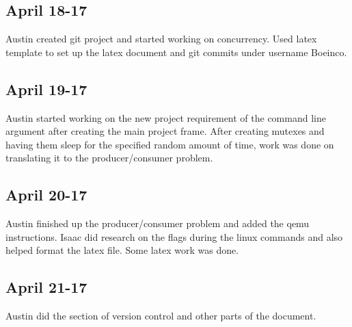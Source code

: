 \documentclass[letterpaper,10pt,titlepage]{article}
\begin{document}
\subsection{April 18-17}
Austin created git project and started working on concurrency.  Used latex template to set up the latex document and git commits under username Boeinco.
\subsection{April 19-17}
Austin started working on the new project requirement of the command line argument after creating the main project frame.  After creating mutexes and having them sleep for the specified random amount of time, work was done on translating it to the producer/consumer problem.
\subsection{April 20-17}
Austin finished up the producer/consumer problem and added the qemu instructions. Isaac did research on the flags during the linux commands and also helped format the latex file.  Some latex work was done.
\subsection{April 21-17}
Austin did the section of version control and other parts of the document.

%
%
\end{document}
